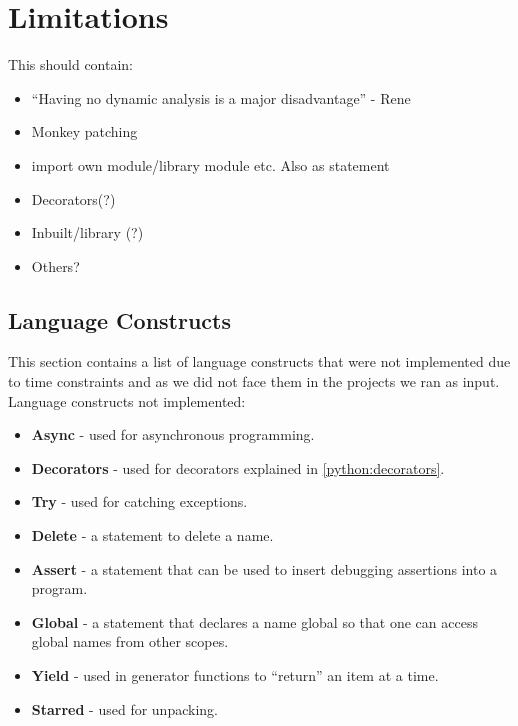 \section{Limitations}
This should contain:
\begin{itemize}
\item ``Having no dynamic analysis is a major disadvantage'' - Rene
\item Monkey patching
\item import own module/library module etc. Also as statement
\item Decorators(?)
\item Inbuilt/library (?)
\item Others?
\end{itemize}

\subsection{Language Constructs}
This section contains a list of language constructs that were not implemented due to time constraints and as we did not face them in the projects we ran as input.
Language constructs not implemented:
\begin{itemize}
\item \textbf{Async} - used for asynchronous programming.\cite{python_async}
\item \textbf{Decorators} - used for decorators explained in \cref{python:decorators}.
\item \textbf{Try} - used for catching exceptions.\cite{python_exception}
\item \textbf{Delete} - a statement to delete a name.\cite{python_delete}
\item \textbf{Assert} - a statement that can be used to insert debugging assertions into a program.\cite{python_assert}
\item \textbf{Global} - a statement that declares a name global so that one can access global names from other scopes.\cite{python_global}
\item \textbf{Yield} - used in generator functions to ``return'' an item at a time.\cite{python_yield}
\item \textbf{Starred} - used for unpacking.\cite{python_unpacking}
\end{itemize}

